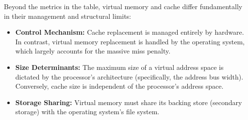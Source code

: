 \noindent Beyond the metrics in the table, virtual memory and cache differ fundamentally in their management and structural limits:
\begin{itemize}
    \item \textbf{Control Mechanism:} Cache replacement is managed entirely by hardware. In contrast, virtual memory replacement is handled by the operating system, which largely accounts for the massive miss penalty.
    \item \textbf{Size Determinants:} The maximum size of a virtual address space is dictated by the processor's architecture (specifically, the address bus width). Conversely, cache size is independent of the processor's address space.
    \item \textbf{Storage Sharing:} Virtual memory must share its backing store (secondary storage) with the operating system's file system.
\end{itemize}

